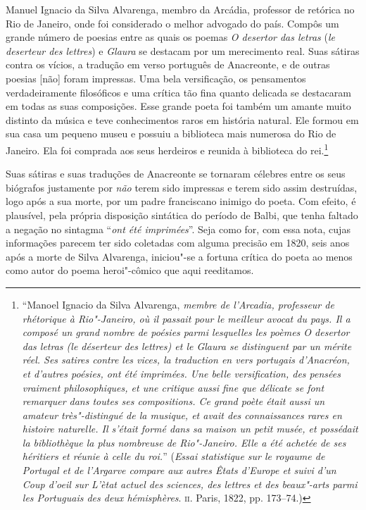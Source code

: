 \begin{hedraquote} Manuel Ignacio da Silva Alvarenga, membro da Arcádia,
professor de retórica no Rio de Janeiro, onde foi considerado o melhor advogado
do país. Compôs um grande número de poesias entre as quais os poemas \textit{O
desertor das letras} (\textit{le deserteur des lettres}) e \textit{Glaura} se
destacam por um merecimento real. Suas sátiras contra os vícios, a tradução em
verso português de Anacreonte, e de outras poesias [não] foram impressas. Uma
bela versificação, os pensamentos verdadeiramente filosóficos e uma crítica tão
fina quanto delicada se destacaram em todas as suas composições. Esse grande
poeta foi também um amante muito distinto da música e teve conhecimentos raros
em história natural.  Ele formou em sua casa um pequeno museu e possuiu a
biblioteca mais numerosa do Rio de Janeiro. Ela foi comprada aos seus herdeiros
e reunida à biblioteca do rei.\footnote{  ``Manoel Ignacio da Silva Alvarenga,
\textit{membre de l'Arcadia, professeur de rhétorique à Rio"-Janeiro, où il
passait pour le meilleur avocat du pays. Il a composé un grand nombre de poésies
parmi lesquelles les poèmes \textit{O desertor das letras} (le déserteur des
lettres) et le \textit{Glaura} se distinguent par un mérite réel. Ses satires
contre les vices, la traduction en vers portugais d'Anacréon, et d'autres
poésies, ont été imprimées. Une belle versification, des pensées vraiment
philosophiques, et une critique aussi fine que délicate se font remarquer dans
toutes ses compositions. Ce grand poète était aussi un amateur très"-distingué de
la musique, et avait des connaissances rares en histoire naturelle. Il s'était
formé dans sa maison un petit musée, et possédait la bibliothèque la plus
nombreuse de Rio"-Janeiro. Elle a été achetée de ses héritiers et réunie à celle
du roi.}'' (\textit{Essai statistique sur le royaume de Portugal et de l'Argarve
compare aux autres Êtats d'Europe et suivi d'un Coup d'oeil sur L'ètat actuel
des sciences, des lettres et des beaux"-arts parmi les Portuguais des deux
hémisphères}. \textsc{ii}. Paris, 1822, pp. 173--74.) } \end{hedraquote}


Suas sátiras e suas traduções de Anacreonte se tornaram célebres entre os seus
biógrafos justamente por \textit{não} terem sido impressas e terem sido assim
destruídas, logo após a sua morte, por um padre franciscano inimigo do poeta.
Com efeito, é plausível, pela própria disposição sintática do período de Balbi,
que tenha faltado a negação no sintagma ``\textit{ont été imprimées}''.  Seja
como for, com essa nota, cujas informações parecem ter sido coletadas com alguma
precisão em 1820, seis anos após a morte de Silva Alvarenga, iniciou"-se a
fortuna crítica do poeta ao menos como autor do poema heroi"-cômico que aqui
reeditamos.

